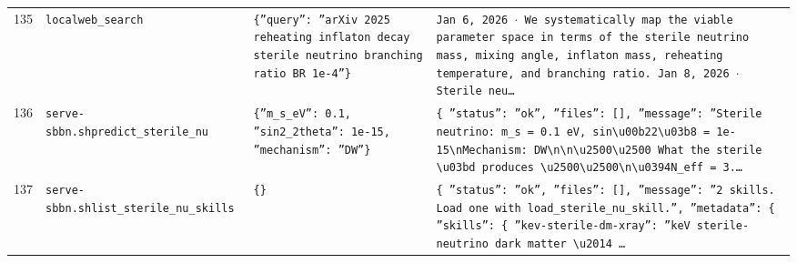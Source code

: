 \documentclass[11pt,a4paper]{article}
\begin{document}
\begin{longtable}{@{}p{}p{}p{}p{}@{}}
135 & \texttt{local}\newline\texttt{web\_\allowbreak{}search} & \texttt{\{''query'':\allowbreak{} ''arXiv 2025 reheating inflaton decay sterile neutrino branching ratio BR 1e-4''\}\allowbreak{}} & \texttt{Jan 6,\allowbreak{} 2026 $\cdot$ We systematically map the viable parameter space in terms of the sterile neutrino mass,\allowbreak{} mixing angle,\allowbreak{} inflaton mass,\allowbreak{} reheating temperature,\allowbreak{} and branching ratio. Jan 8,\allowbreak{} 2026 $\cdot$ Sterile neu\ldots{}\allowbreak{}} \\
136 & \texttt{serve-sbbn.sh}\newline\texttt{predict\_\allowbreak{}sterile\_\allowbreak{}nu} & \texttt{\{''m\_\allowbreak{}s\_\allowbreak{}eV'':\allowbreak{} 0.1,\allowbreak{} ''sin2\_\allowbreak{}2theta'':\allowbreak{} 1e-15,\allowbreak{} ''mechanism'':\allowbreak{} ''DW''\}\allowbreak{}} & \texttt{\{   ''status'':\allowbreak{} ''ok'',\allowbreak{}   ''files'':\allowbreak{} []\allowbreak{},\allowbreak{}   ''message'':\allowbreak{} ''Sterile neutrino:\allowbreak{} m\_\allowbreak{}s =\allowbreak{} 0.1 eV,\allowbreak{} sin\textbackslash{}\allowbreak{}u00b22\textbackslash{}\allowbreak{}u03b8 =\allowbreak{} 1e-15\textbackslash{}\allowbreak{}nMechanism:\allowbreak{} DW\textbackslash{}\allowbreak{}n\textbackslash{}\allowbreak{}n\textbackslash{}\allowbreak{}u2500\textbackslash{}\allowbreak{}u2500 What the sterile \textbackslash{}\allowbreak{}u03bd produces \textbackslash{}\allowbreak{}u2500\textbackslash{}\allowbreak{}u2500\textbackslash{}\allowbreak{}n\textbackslash{}\allowbreak{}u0394N\_\allowbreak{}eff =\allowbreak{} 3.\ldots{}\allowbreak{}} \\
137 & \texttt{serve-sbbn.sh}\newline\texttt{list\_\allowbreak{}sterile\_\allowbreak{}nu\_\allowbreak{}skills} & \texttt{\{\}\allowbreak{}} & \texttt{\{   ''status'':\allowbreak{} ''ok'',\allowbreak{}   ''files'':\allowbreak{} []\allowbreak{},\allowbreak{}   ''message'':\allowbreak{} ''2 skills. Load one with load\_\allowbreak{}sterile\_\allowbreak{}nu\_\allowbreak{}skill.'',\allowbreak{}   ''metadata'':\allowbreak{} \{     ''skills'':\allowbreak{} \{       ''kev-sterile-dm-xray'':\allowbreak{} ''keV sterile-neutrino dark matter \textbackslash{}\allowbreak{}u2014 \ldots{}\allowbreak{}} \\

\end{longtable}
\end{document}
